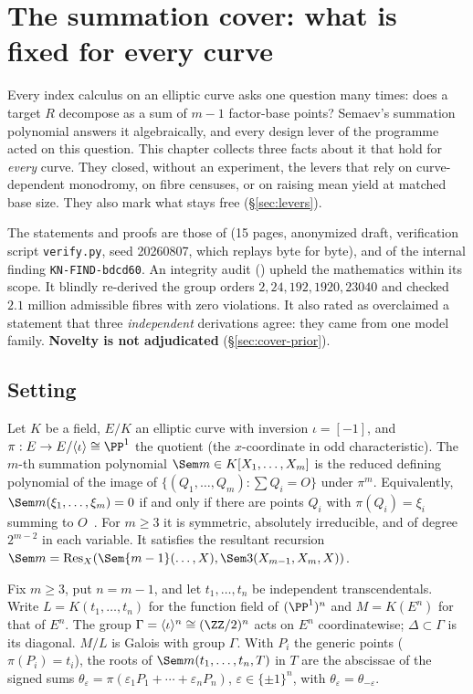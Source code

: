 \chapter{The summation cover: what is fixed for every curve}\label{ch:cover}

Every index calculus on an elliptic curve asks one question many times:
does a target $R$ decompose as a sum of $m-1$ factor-base points? Semaev's
summation polynomial answers it algebraically, and every design lever of
the programme acted on this question. This chapter collects three facts
about it that hold for \emph{every} curve. They closed, without an experiment, the levers
that rely on curve-dependent monodromy, on fibre censuses, or on raising
mean yield at matched base size. They also mark what stays free
(\S\ref{sec:levers}).

The statements and proofs are those of
(15 pages, anonymized draft, verification script
\texttt{verify.py}, seed 20260807, which replays byte for byte), and of the
internal finding \texttt{KN-FIND-bdcd60}. An integrity audit
() upheld
the mathematics within its scope. It blindly re-derived the group orders
$2,24,192,1920,23040$ and checked $2.1$ million admissible fibres with zero
violations. It also rated as overclaimed a statement that three
\emph{independent} derivations agree: they came from one model family.
\textbf{Novelty is not adjudicated} (\S\ref{sec:cover-prior}).

\section{Setting}

Let $K$ be a field, $E/K$ an elliptic curve with inversion $\iota=[-1]$,
and $\pi:E\to E/\langle\iota\rangle\cong\PP^1$ the quotient (the
$x$-coordinate in odd characteristic). The $m$-th summation polynomial
$\Sem m\in K[X_1,\dots,X_m]$ is the reduced defining polynomial of the
image of $\{(Q_1,\dots,Q_m):\sum Q_i=O\}$ under $\pi^m$. Equivalently,
$\Sem m(\xi_1,\ldots,\xi_m)=0$ if and only if there are points $Q_i$ with
$\pi(Q_i)=\xi_i$ summing to $O$~\cite{semaev2004}. For $m\ge3$ it is
symmetric, absolutely irreducible, and of degree $2^{m-2}$ in each
variable. It satisfies the resultant recursion
$\Sem m=\operatorname{Res}_X(\Sem{m-1}(\ldots,X),\Sem3(X_{m-1},X_m,X))$.

Fix $m\ge3$, put $n=m-1$, and let $t_1,\dots,t_n$ be independent
transcendentals. Write $L=K(t_1,\dots,t_n)$ for the function field of
$(\PP^1)^n$ and $M=K(E^n)$ for that of $E^n$. The group
$\Gamma=\langle\iota\rangle^n\cong(\ZZ/2)^n$ acts on $E^n$
coordinatewise; $\Delta\subset\Gamma$ is its diagonal. $M/L$ is Galois with
group $\Gamma$. With $P_i$ the generic points ($\pi(P_i)=t_i$), the roots of
$\Sem m(t_1,\ldots,t_n,T)$ in $T$ are the abscissae of the signed sums
$\theta_\varepsilon=\pi(\varepsilon_1P_1+\cdots+\varepsilon_nP_n)$,
$\varepsilon\in\{\pm1\}^n$, with $\theta_\varepsilon=\theta_{-\varepsilon}$.

